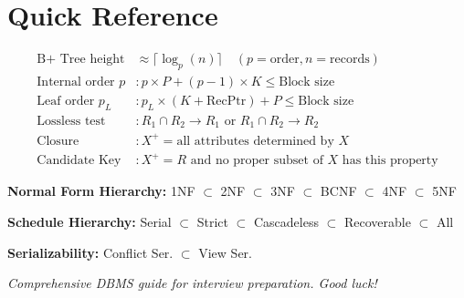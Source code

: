 \documentclass[12pt,a4paper]{article}
\begin{document}
\section*{Quick Reference}

\begin{tcolorbox}[colback=lightyellow, colframe=orange, title=\textbf{Key Formulas \& Facts}]
\begin{align*}
\text{B+ Tree height} &\approx \lceil \log_p(n) \rceil \quad (p = \text{order}, n = \text{records}) \\
\text{Internal order } p &: p \times P + (p-1) \times K \leq \text{Block size} \\
\text{Leaf order } p_L &: p_L \times (K + \text{RecPtr}) + P \leq \text{Block size} \\[6pt]
\text{Lossless test} &: R_1 \cap R_2 \to R_1 \text{ or } R_1 \cap R_2 \to R_2 \\[6pt]
\text{Closure} &: X^+ = \text{all attributes determined by } X \\
\text{Candidate Key} &: X^+ = R \text{ and no proper subset of } X \text{ has this property}
\end{align*}

\textbf{Normal Form Hierarchy:} 1NF $\subset$ 2NF $\subset$ 3NF $\subset$ BCNF $\subset$ 4NF $\subset$ 5NF

\textbf{Schedule Hierarchy:} Serial $\subset$ Strict $\subset$ Cascadeless $\subset$ Recoverable $\subset$ All

\textbf{Serializability:} Conflict Ser. $\subset$ View Ser.
\end{tcolorbox}

\vfill
\begin{center}
\textit{Comprehensive DBMS guide for interview preparation. Good luck!}
\end{center}
\end{document}
